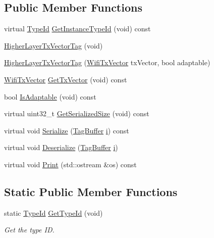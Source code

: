 \subsection*{Public Member Functions}
\begin{DoxyCompactItemize}
\item 
virtual \hyperlink{classns3_1_1TypeId}{Type\+Id} \hyperlink{classns3_1_1HigherLayerTxVectorTag_a6eb3fb2ef1d70fe1fe1199d10c25f451}{Get\+Instance\+Type\+Id} (void) const 
\item 
\hyperlink{classns3_1_1HigherLayerTxVectorTag_a8888b9e437cae59ac0910d987a0a25cd}{Higher\+Layer\+Tx\+Vector\+Tag} (void)
\item 
\hyperlink{classns3_1_1HigherLayerTxVectorTag_acfc4b717d4aa396e367712e83b814d0e}{Higher\+Layer\+Tx\+Vector\+Tag} (\hyperlink{classns3_1_1WifiTxVector}{Wifi\+Tx\+Vector} tx\+Vector, bool adaptable)
\item 
\hyperlink{classns3_1_1WifiTxVector}{Wifi\+Tx\+Vector} \hyperlink{classns3_1_1HigherLayerTxVectorTag_aaf26ab86802e8b4c1707097896202827}{Get\+Tx\+Vector} (void) const 
\item 
bool \hyperlink{classns3_1_1HigherLayerTxVectorTag_a0fe4a241cc04378a49dcf83e81144249}{Is\+Adaptable} (void) const 
\item 
virtual uint32\+\_\+t \hyperlink{classns3_1_1HigherLayerTxVectorTag_af82b791129a3380c615ae0dd298ce5da}{Get\+Serialized\+Size} (void) const 
\item 
virtual void \hyperlink{classns3_1_1HigherLayerTxVectorTag_acb7cd5e3bde7e9b7091c224260242452}{Serialize} (\hyperlink{classns3_1_1TagBuffer}{Tag\+Buffer} \hyperlink{lte__uplink__power__control_8m_a6f6ccfcf58b31cb6412107d9d5281426}{i}) const 
\item 
virtual void \hyperlink{classns3_1_1HigherLayerTxVectorTag_ad095a66b9799cae9656432be76c273e6}{Deserialize} (\hyperlink{classns3_1_1TagBuffer}{Tag\+Buffer} \hyperlink{lte__uplink__power__control_8m_a6f6ccfcf58b31cb6412107d9d5281426}{i})
\item 
virtual void \hyperlink{classns3_1_1HigherLayerTxVectorTag_a44cac081cca5ea6e7106c5be157d4db5}{Print} (std\+::ostream \&os) const 
\end{DoxyCompactItemize}
\subsection*{Static Public Member Functions}
\begin{DoxyCompactItemize}
\item 
static \hyperlink{classns3_1_1TypeId}{Type\+Id} \hyperlink{classns3_1_1HigherLayerTxVectorTag_ac12d5c649a9201460d81738af7d1c1c7}{Get\+Type\+Id} (void)
\begin{DoxyCompactList}\small\item\em Get the type ID. \end{DoxyCompactList}\end{DoxyCompactItemize}
